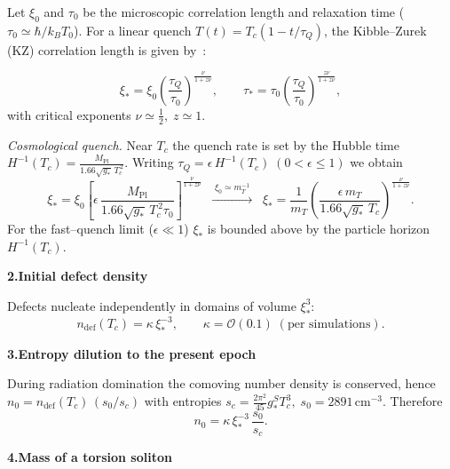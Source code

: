 \documentclass{article}
\begin{document}
Let  
\(\xi_0\) and \(\tau_0\) be the microscopic correlation length
and relaxation time (\(\tau_0\simeq\hbar/k_{\!B}T_0\)).
For a linear quench \(T(t)=T_c(1-t/\tau_Q)\), the Kibble–Zurek (KZ) correlation length is given by~\cite{kibble1976,Żurek1985}:

\begin{equation}
\xi_*=\xi_0\!\left(\frac{\tau_Q}{\tau_0}\right)^{\!\frac{\nu}{1+z\nu}},
\qquad
\tau_*=\tau_0\!\left(\frac{\tau_Q}{\tau_0}\right)^{\!\frac{z\nu}{1+z\nu}},
\end{equation}
with critical exponents \(\nu\simeq\frac12,\;z\simeq1\).

\medskip
\noindent
\emph{Cosmological quench.}  
Near \(T_c\) the quench rate is set by the Hubble time
\(H^{-1}(T_c)=\frac{M_{\text{Pl}}}{1.66\sqrt{g_*}\,T_c^{\,2}}\).
Writing \(\tau_Q=\epsilon\,H^{-1}(T_c)\;(0<\epsilon\le1)\) we obtain  
\begin{equation}\label{eq:auto72}
\xi_*=\xi_0\left[\epsilon\,
\frac{M_{\text{Pl}}}{1.66\sqrt{g_*}\,T_c^{\,2}\tau_0}\right]^{\!\frac{\nu}{1+z\nu}}
\;\; \xrightarrow{\;\xi_0\simeq m_T^{-1}\;}
\;\;\xi_*=\frac{1}{m_T}\!
\left(\frac{\epsilon\,m_T}{1.66\sqrt{g_*}\,T_c}\right)^{\!\frac{\nu}{1+z\nu}}\!.
\end{equation}
For the fast--quench limit (\(\epsilon\!\ll\!1\)) \(\xi_*\) is bounded above by the particle horizon
\(H^{-1}(T_c)\).

\vspace{0.6em}
\noindent\textbf{2.\;Initial defect density}

Defects nucleate independently in domains of volume \(\xi_*^3\):
\begin{equation}\label{eq:auto73}
n_{\text{def}}(T_c)=\kappa\,\xi_*^{-3},
\qquad
\kappa=\mathcal{O}(0.1)\;(\text{per simulations}).
\end{equation}

\vspace{0.6em}
\noindent\textbf{3.\;Entropy dilution to the present epoch}

During radiation domination the comoving number density is conserved, hence  
\(n_0 = n_{\text{def}}(T_c)\,(s_0/s_c)\) with entropies  
\(s_c=\tfrac{2\pi^2}{45}g_*^S T_c^{3},\; s_0=2891\,\text{cm}^{-3}\).
Therefore
\begin{equation}\label{eq:auto74}
n_0 = \kappa\,\xi_*^{-3}\,
\frac{s_0}{s_c}.
\end{equation}

\vspace{0.6em}
\noindent\textbf{4.\;Mass of a torsion soliton}
\end{document}
